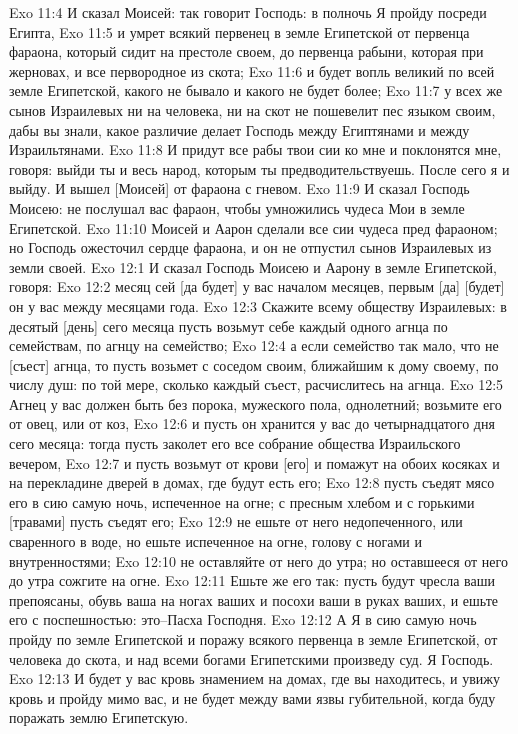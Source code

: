 Exo 11:4  И сказал Моисей: так говорит Господь: в полночь Я пройду посреди Египта,
Exo 11:5  и умрет всякий первенец в земле Египетской от первенца фараона, который сидит на престоле своем, до первенца рабыни, которая при жерновах, и все первородное из скота;
Exo 11:6  и будет вопль великий по всей земле Египетской, какого не бывало и какого не будет более;
Exo 11:7  у всех же сынов Израилевых ни на человека, ни на скот не пошевелит пес языком своим, дабы вы знали, какое различие делает Господь между Египтянами и между Израильтянами.
Exo 11:8  И придут все рабы твои сии ко мне и поклонятся мне, говоря: выйди ты и весь народ, которым ты предводительствуешь. После сего я и выйду. И вышел [Моисей] от фараона с гневом.
Exo 11:9  И сказал Господь Моисею: не послушал вас фараон, чтобы умножились чудеса Мои в земле Египетской.
Exo 11:10  Моисей и Аарон сделали все сии чудеса пред фараоном; но Господь ожесточил сердце фараона, и он не отпустил сынов Израилевых из земли своей.
Exo 12:1  И сказал Господь Моисею и Аарону в земле Египетской, говоря:
Exo 12:2  месяц сей [да будет] у вас началом месяцев, первым [да] [будет] он у вас между месяцами года.
Exo 12:3  Скажите всему обществу Израилевых: в десятый [день] сего месяца пусть возьмут себе каждый одного агнца по семействам, по агнцу на семейство;
Exo 12:4  а если семейство так мало, что не [съест] агнца, то пусть возьмет с соседом своим, ближайшим к дому своему, по числу душ: по той мере, сколько каждый съест, расчислитесь на агнца.
Exo 12:5  Агнец у вас должен быть без порока, мужеского пола, однолетний; возьмите его от овец, или от коз,
Exo 12:6  и пусть он хранится у вас до четырнадцатого дня сего месяца: тогда пусть заколет его все собрание общества Израильского вечером,
Exo 12:7  и пусть возьмут от крови [его] и помажут на обоих косяках и на перекладине дверей в домах, где будут есть его;
Exo 12:8  пусть съедят мясо его в сию самую ночь, испеченное на огне; с пресным хлебом и с горькими [травами] пусть съедят его;
Exo 12:9  не ешьте от него недопеченного, или сваренного в воде, но ешьте испеченное на огне, голову с ногами и внутренностями;
Exo 12:10  не оставляйте от него до утра; но оставшееся от него до утра сожгите на огне.
Exo 12:11  Ешьте же его так: пусть будут чресла ваши препоясаны, обувь ваша на ногах ваших и посохи ваши в руках ваших, и ешьте его с поспешностью: это--Пасха Господня.
Exo 12:12  А Я в сию самую ночь пройду по земле Египетской и поражу всякого первенца в земле Египетской, от человека до скота, и над всеми богами Египетскими произведу суд. Я Господь.
Exo 12:13  И будет у вас кровь знамением на домах, где вы находитесь, и увижу кровь и пройду мимо вас, и не будет между вами язвы губительной, когда буду поражать землю Египетскую.
